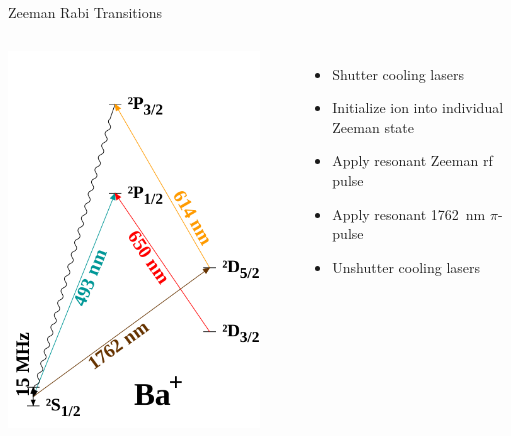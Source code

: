 \documentclass{beamer}
\begin{document}
\begin{frame}{Zeeman Rabi Transitions}
\begin{columns}[c]
	\includegraphics[width=0.9\textwidth]{ionized-Ba-zeeman}
	\begin{itemize}
		\item Shutter cooling lasers
		\item Initialize ion into individual Zeeman state
		\item Apply resonant Zeeman rf pulse
		\item Apply resonant 1762~nm $\pi$-pulse
		\item Unshutter cooling lasers
	\end{itemize}
\end{columns}
\end{frame}
\end{document}
